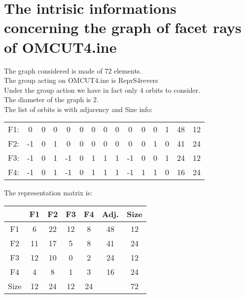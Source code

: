 \documentclass[12pt]{article}
\begin{document}
\section{The intrisic informations concerning the graph of facet rays of OMCUT4.ine}
The graph considered is made of $72$ elements.\\
The group acting on OMCUT4.ine is ReprS4revers\\
Under the group action we have in fact only $4$ orbits to consider.\\
The diameter of the graph is $2$.\\
The list of orbits is with adjacency and Size info:
\begin{center}
\scriptsize
\begin{tabular}{ccccccccccccc|c|c}
F1:&0&0&0&0&0&0&0&0&0&0&0&1&48&12\\
F2:&-1&0&1&0&0&0&0&0&0&0&1&0&41&24\\
F3:&-1&0&1&-1&0&1&1&1&-1&0&0&1&24&12\\
F4:&-1&0&1&-1&0&1&1&1&-1&1&1&0&16&24\\
\end{tabular}
\end{center}
The representation matrix is:
\begin{center}
\scriptsize
\begin{tabular}{|c|cccc|c|c|}
\hline
&F1&F2&F3&F4&Adj.&Size\\
\hline
F1& 6& 22& 12& 8&48&12\\
F2& 11& 17& 5& 8&41&24\\
F3& 12& 10& 0& 2&24&12\\
F4& 4& 8& 1& 3&16&24\\
\hline
Size&12&24&12&24&&72\\
\hline
\end{tabular}
\end{center}
\end{document}
